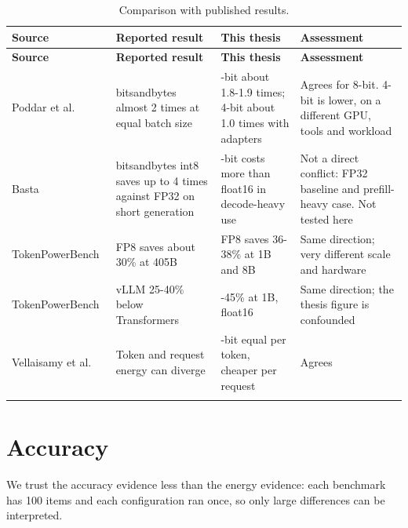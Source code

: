 \begingroup\footnotesize\setlength{\tabcolsep}{4pt}
\begin{longtable}{>{\raggedright\arraybackslash}p{36.3mm}>{\raggedright\arraybackslash}p{33.4mm}>{\raggedright\arraybackslash}p{33.1mm}>{\raggedright\arraybackslash}p{36.0mm}}
\caption[Comparison with published results]{Comparison with published results.}\\
\toprule
\textbf{Source} & \textbf{Reported result} & \textbf{This thesis} & \textbf{Assessment} \\
\midrule
\endfirsthead
\toprule
\textbf{Source} & \textbf{Reported result} & \textbf{This thesis} & \textbf{Assessment} \\
\midrule
\endhead
Poddar et al.~\cite{b6} & bitsandbytes almost 2 times at equal batch size & 8-bit about 1.8-1.9 times; 4-bit about 1.0 times with adapters & Agrees for 8-bit. 4-bit is lower, on a different GPU, tools and workload \\*
Basta~\cite{b47} & bitsandbytes int8 saves up to 4 times against FP32 on short generation & 8-bit costs more than float16 in decode-heavy use & Not a direct conflict: FP32 baseline and prefill-heavy case. Not tested here \\*
TokenPowerBench~\cite{b7} & FP8 saves about 30\% at 405B & FP8 saves 36-38\% at 1B and 8B & Same direction; very different scale and hardware \\*
TokenPowerBench~\cite{b7} & vLLM 25-40\% below Transformers & 41-45\% at 1B, float16 & Same direction; the thesis figure is confounded \\*
Vellaisamy et al.~\cite{b8} & Token and request energy can diverge & 4-bit equal per token, cheaper per request & Agrees \\*
\bottomrule\noalign{\nobreak}
\end{longtable}
\endgroup

\section{Accuracy}
We trust the accuracy evidence less than the energy evidence: each benchmark has 100 items and each configuration ran once, so only large differences can be interpreted.


